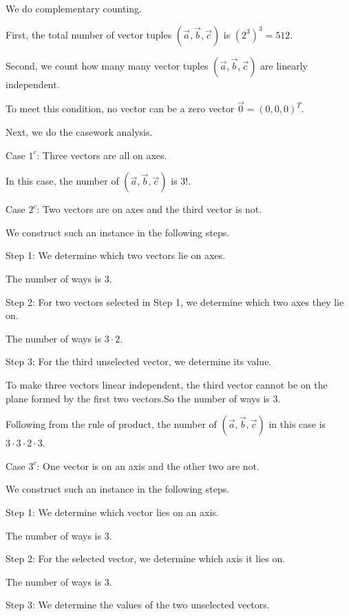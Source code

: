 \begin{enumerate}
 We do complementary counting.

 First, the total number of vector tuples $\left( \overrightarrow{a} , \overrightarrow{b} , \overrightarrow{c} \right)$ is $\left( 2^3 \right)^3 = 512$.

 Second, we count how many many vector tuples $\left( \overrightarrow{a} , \overrightarrow{b} , \overrightarrow{c} \right)$ are linearly independent.

 To meet this condition, no vector can be a zero vector $\overrightarrow{0} = \left( 0, 0, 0 \right)^T$.

 Next, we do the casework analysis.

 Case $1^c$: Three vectors are all on axes.

 In this case, the number of $\left( \overrightarrow{a} , \overrightarrow{b} , \overrightarrow{c} \right)$ is $3!$.

 Case $2^c$: Two vectors are on axes and the third vector is not.

 We construct such an instance in the following steps.

 Step 1: We determine which two vectors lie on axes.

 The number of ways is $3$.

 Step 2: For two vectors selected in Step 1, we determine which two axes they lie on.

 The number of ways is $3 \cdot 2$.

 Step 3: For the third unselected vector, we determine its value.

 To make three vectors linear independent, the third vector cannot be on the plane formed by the first two vectors.So the number of ways is $3$.

 Following from the rule of product, the number of $\left( \overrightarrow{a} , \overrightarrow{b} , \overrightarrow{c} \right)$ in this case is $3 \cdot 3 \cdot 2 \cdot 3$.

 Case $3^c$: One vector is on an axis and the other two are not.

 We construct such an instance in the following steps.

 Step 1: We determine which vector lies on an axis.

 The number of ways is $3$.

 Step 2: For the selected vector, we determine which axis it lies on.

 The number of ways is $3$.

 Step 3: We determine the values of the two unselected vectors.


\end{enumerate}
